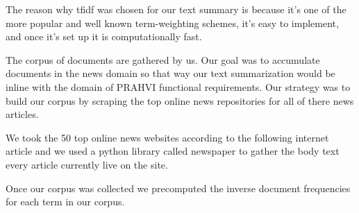 The reason why tfidf was chosen for our text summary is because it's one of the more popular and well known term-weighting schemes, it's easy to implement, and once it's set up it is computationally fast.

The corpus of documents are gathered by us. Our goal was to accumulate documents in the news domain so that way our text summarization would be inline with the domain of PRAHVI functional requirements. Our strategy was to build our corpus by scraping the top online news repositories for all of there news articles. 

We took the 50 top online news websites according to the following internet article and we used a python library called newspaper to gather the body text every article currently live on the site.

Once our corpus was collected we precomputed the inverse document frequencies for each term in our corpus.
